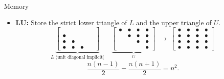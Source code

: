 \documentclass[10pt]{beamer}
\begin{document}
\begin{frame}{Memory}

\begin{itemize}
    \item \textbf{LU:} Store the strict lower triangle of $L$
    and the upper triangle of $U$.
    \[
    \underbrace{
    \begin{bmatrix}
    \phantom{\bullet} & \phantom{\bullet} & \phantom{\bullet} & \phantom{\bullet}\\
    \bullet & \phantom{\bullet} & \phantom{\bullet} & \phantom{\bullet}\\
    \bullet & \bullet & \phantom{\bullet} & \phantom{\bullet}\\
    \bullet & \bullet & \bullet & \phantom{\bullet}
    \end{bmatrix}
    }_{L\text{ (unit diagonal implicit)}}
    \quad
    \underbrace{
    \begin{bmatrix}
    \bullet & \bullet & \bullet & \bullet\\
    \phantom{\bullet} & \bullet & \bullet & \bullet\\
    \phantom{\bullet} & \phantom{\bullet} & \bullet & \bullet\\
    \phantom{\bullet} & \phantom{\bullet} & \phantom{\bullet} & \bullet
    \end{bmatrix}
    }_{U}
    \;\longrightarrow\;
    \begin{bmatrix}
    \bullet & \bullet & \bullet & \bullet\\
    \bullet & \bullet & \bullet & \bullet\\
    \bullet & \bullet & \bullet & \bullet\\
    \bullet & \bullet & \bullet & \bullet
    \end{bmatrix}
    \]
    \[
        \frac{n(n-1)}{2}+\frac{n(n+1)}{2}
        =\boxed{n^2}.
    \]


\end{itemize}
\end{frame}
\end{document}

